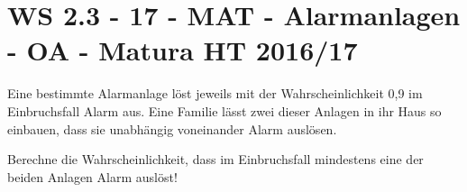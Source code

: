 \section{WS 2.3 - 17 - MAT - Alarmanlagen - OA - Matura HT 2016/17}

\begin{beispiel}[WS 2.3]{1} %
Eine bestimmte Alarmanlage löst jeweils mit der Wahrscheinlichkeit 0,9 im Einbruchsfall Alarm aus. Eine Familie lässt zwei dieser Anlagen in ihr Haus so einbauen, dass sie unabhängig voneinander Alarm auslösen. \leer

Berechne die Wahrscheinlichkeit, dass im Einbruchsfall mindestens eine der beiden Anlagen
Alarm auslöst!	

\end{beispiel}
